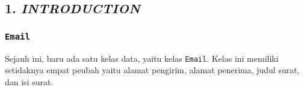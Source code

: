 \subsection*{\textcolor{subsectioncolor}{\textsf{1. \textit{INTRODUCTION}}}}

\subsubsection*{\texttt{Email}}
Sejauh ini, baru ada satu kelas data, yaitu kelas \texttt{Email}.
Kelas ini memiliki setidaknya empat peubah yaitu alamat pengirim, alamat penerima, judul surat, dan isi surat.
